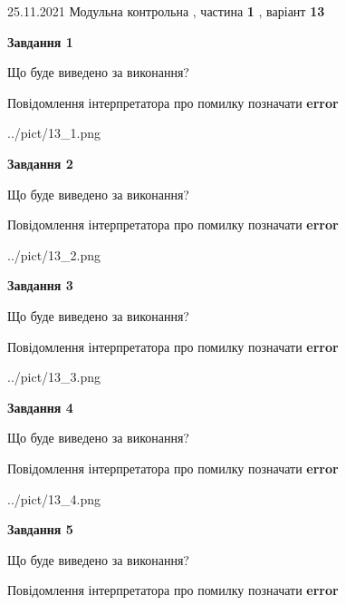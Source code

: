 \documentclass[10pt, ukrainian]{article}
\begin{document}
{25.11.2021 Модульна контрольна , частина \textbf { 1 }, варіант  \No \textbf { 13 }\par}
{
\begin {large}

{\begin {center}\textbf{Завдання 1}\end {center}}\par
Що буде виведено за виконання? \par
Повідомлення інтерпретатора про помилку позначати \textbf{error}

\begin{center}
	{../pict/13_1.png}
\end{center}
\newpage

{\begin {center}\textbf{Завдання 2}\end {center}}\par
Що буде виведено за виконання? \par
Повідомлення інтерпретатора про помилку позначати \textbf{error}

\begin{center}
	{../pict/13_2.png}
\end{center}
\newpage

{\begin {center}\textbf{Завдання 3}\end {center}}\par
Що буде виведено за виконання? \par
Повідомлення інтерпретатора про помилку позначати \textbf{error}

\begin{center}
	{../pict/13_3.png}
\end{center}
\newpage

{\begin {center}\textbf{Завдання 4}\end {center}}\par
Що буде виведено за виконання? \par
Повідомлення інтерпретатора про помилку позначати \textbf{error}

\begin{center}
	{../pict/13_4.png}
\end{center}
\newpage

{\begin {center}\textbf{Завдання 5}\end {center}}\par
Що буде виведено за виконання? \par
Повідомлення інтерпретатора про помилку позначати \textbf{error}


\end{large}}
\end{document}
